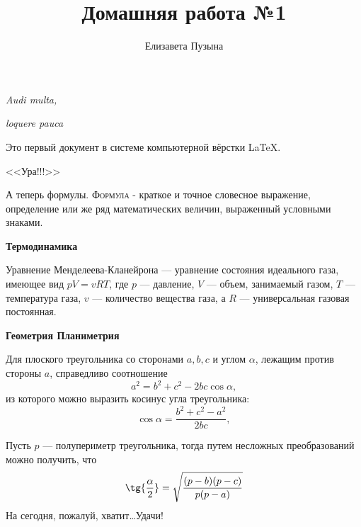 \documentclass[12pt]{article}
\title{Домашняя работа №1}
\author{Елизавета Пузына}
\date{}
\begin{document}
	\maketitle
	\begin{flushright}

	\textit{Audi multa,}
	
	\textit{loquere pauca}

	\end{flushright}

	\begin{flushleft}
	{\vspace{20pt} \hspace{14pt}}Это первый документ в системе компьютерной вёрстки {\LaTeX}.
	\end{flushleft}
	
	\begin{center}
	{\huge \textsf{<<Ура!!!>>}}
	\end{center}
	
	\begin{flushleft}
	{\hspace{14pt}}А теперь формулы. {\textsc{Формула}} - краткое и точное словесное выражение, определение или же  ряд математических величин, выраженный условными знаками.
	
    {\vspace{15pt} \hspace{28pt} \bfseries \Large Термодинамика}
	
	{\hspace{14pt}}Уравнение Менделеева-Кланейрона --- уравнение состояния идеального газа, имеющее вид ${pV = vRT}$, где ${p}$ --- давление, ${V}$ --- объем, занимаемый газом, ${T}$ --- температура газа, ${v}$ --- количество вещества газа, а ${R}$ --- универсальная газовая постоянная.
	
	{\vspace{15pt} \hspace{28pt} \bfseries \Large Геометрия \hfill \bfseries \Large Планиметрия}
	
	{\hspace{14pt}}Для плоского треугольника со сторонами ${a, b, c}$ и углом ${\alpha}$, лежащим против стороны ${a}$, справедливо соотношение
	$$
	a^2 = b^2 + c^2 - 2bc {\cos{\alpha}},
	$$
	из которого можно выразить косинус угла треугольника:
	$$
	{\cos{\alpha}} = \frac{b^2 + c^2 - a^2}{2bc},
	$$
	
	{\hspace{14pt}}Пусть ${p}$ --- полупериметр треугольника, тогда путем несложных преобразований можно получить, что
	$$
	{\tg {\frac{\alpha}{2}} = {\sqrt{\frac{(p-b)(p-c)}{p(p-a)}}}}
	$$
	{\vspace{1cm}}На сегодня, пожалуй, хватит\dots Удачи!
	\end{flushleft}
\end{document}
